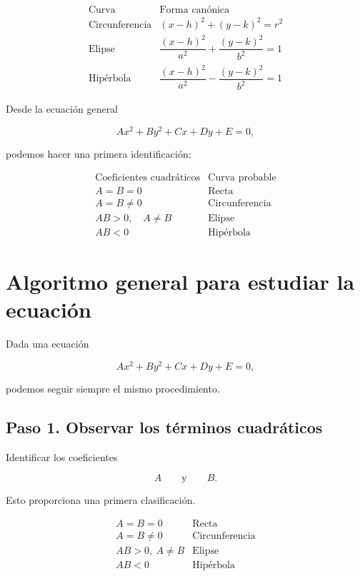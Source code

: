 \documentclass[12pt]{article}
\begin{document}
{\[
\boxed{
\begin{array}{c|c}
\text{Curva} & \text{Forma canónica}\\
\hline
\text{Circunferencia}
&
(x-h)^2+(y-k)^2=r^2
\\[2mm]
\text{Elipse}
&
\dfrac{(x-h)^2}{a^2}
+
\dfrac{(y-k)^2}{b^2}
=1
\\[4mm]
\text{Hipérbola}
&
\dfrac{(x-h)^2}{a^2}
-
\dfrac{(y-k)^2}{b^2}
=1
\end{array}
}
\]

Desde la ecuación general

\[
Ax^2+By^2+Cx+Dy+E=0,
\]

podemos hacer una primera identificación:

\[
\boxed{
\begin{array}{c|c}
\text{Coeficientes cuadráticos} & \text{Curva probable}\\
\hline
A=B=0 & \text{Recta}\\
A=B\neq0 & \text{Circunferencia}\\
AB>0,\quad A\neq B & \text{Elipse}\\
AB<0 & \text{Hipérbola}
\end{array}
}
\]

\section{Algoritmo general para estudiar la ecuación}

Dada una ecuación

\[
Ax^2+By^2+Cx+Dy+E=0,
\]

podemos seguir siempre el mismo procedimiento.

\subsection*{Paso 1. Observar los términos cuadráticos}

Identificar los coeficientes

\[
A
\qquad\text{y}\qquad
B.
\]

Esto proporciona una primera clasificación.

\[
\begin{array}{c|c}
A=B=0 & \text{Recta}\\
A=B\neq0 & \text{Circunferencia}\\
AB>0,\ A\neq B & \text{Elipse}\\
AB<0 & \text{Hipérbola}
\end{array}
\]

}
\end{document}
